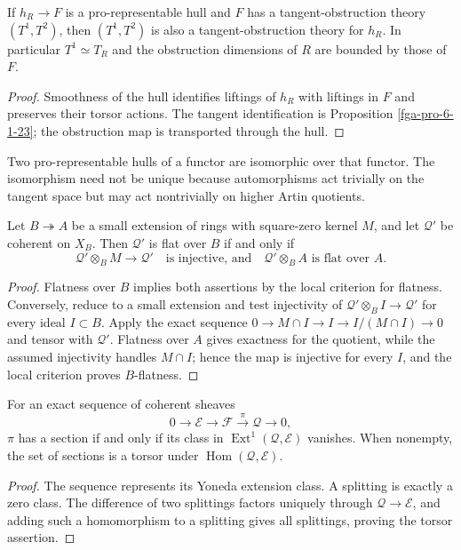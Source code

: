 \begin{lemma}\label{fga-lem-6-3-3}
If $h_R\to F$ is a pro-representable hull and $F$ has a tangent-obstruction
theory $(T^1,T^2)$, then $(T^1,T^2)$ is also a tangent-obstruction theory for
$h_R$.  In particular $T^1\simeq T_R$ and the obstruction dimensions of $R$
are bounded by those of $F$.
\end{lemma}
\begin{proof}
Smoothness of the hull identifies liftings of $h_R$ with liftings in $F$ and
preserves their torsor actions.  The tangent identification is Proposition
\ref{fga-pro-6-1-23}; the obstruction map is transported through the hull.
\end{proof}

\begin{remark}\label{fga-rem-6-3-6}
Two pro-representable hulls of a functor are isomorphic over that functor.  The
isomorphism need not be unique because automorphisms act trivially on the tangent
space but may act nontrivially on higher Artin quotients.
\end{remark}

\begin{lemma}\label{fga-lem-6-4-3}\uses{}
Let $B\twoheadrightarrow A$ be a small extension of rings with square-zero
kernel $M$, and let $\mathcal Q'$ be coherent on $X_B$.  Then $\mathcal Q'$ is
flat over $B$ if and only if
\[
\mathcal Q'\otimes_BM\longrightarrow\mathcal Q'
\quad\text{is injective, and}\quad
\mathcal Q'\otimes_BA\text{ is flat over }A.
\]
\end{lemma}
\begin{proof}
Flatness over $B$ implies both assertions by the local criterion for flatness.
Conversely, reduce to a small extension and test injectivity of
$\mathcal Q'\otimes_BI\to\mathcal Q'$ for every ideal $I\subset B$.  Apply the
exact sequence $0\to M\cap I\to I\to I/(M\cap I)\to0$ and tensor with
$\mathcal Q'$.  Flatness over $A$ gives exactness for the quotient, while the
assumed injectivity handles $M\cap I$; hence the map is injective for every
$I$, and the local criterion proves $B$-flatness.
\end{proof}

\begin{lemma}\label{fga-lem-6-4-4}\uses{}
For an exact sequence of coherent sheaves
\[
0\longrightarrow\mathcal E\longrightarrow\mathcal F
 \xrightarrow{\pi}\mathcal Q\longrightarrow0,
\]
$\pi$ has a section if and only if its class in
$\operatorname{Ext}^1(\mathcal Q,\mathcal E)$ vanishes.  When nonempty, the set
of sections is a torsor under $\operatorname{Hom}(\mathcal Q,\mathcal E)$.
\end{lemma}
\begin{proof}
The sequence represents its Yoneda extension class.  A splitting is exactly a
zero class.  The difference of two splittings factors uniquely through
$\mathcal Q\to\mathcal E$, and adding such a homomorphism to a splitting gives
all splittings, proving the torsor assertion.
\end{proof}

